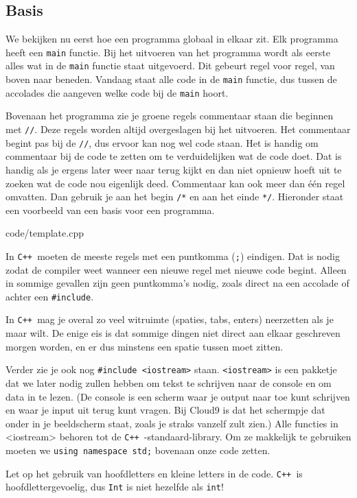 \documentclass[12pt,a4paper]{article}
\newcommand{\code}{}
\newcommand{\icode}{\lstinline}
\newcommand{\mono}{\texttt}
\newcommand{\cpp}{\mono{C++ }}
\begin{document}
\subsection{Basis}
We bekijken nu eerst hoe een programma globaal in elkaar zit.  Elk programma heeft een \icode{main} functie. Bij het uitvoeren van het programma wordt als eerste alles wat in de \icode{main} functie staat uitgevoerd. Dit gebeurt regel voor regel, van boven naar beneden. Vandaag staat alle code in de \icode{main} functie, dus tussen de accolades die aangeven welke code bij de \icode{main} hoort.

Bovenaan het programma zie je groene regels commentaar staan die beginnen met \icode{//}. Deze regels worden altijd overgeslagen bij het uitvoeren. Het commentaar begint pas bij de \icode{//}, dus ervoor kan nog wel code staan. Het is handig om commentaar bij de code te zetten om te verduidelijken wat de code doet. Dat is handig als je ergens later weer naar terug kijkt en dan niet opnieuw hoeft uit te zoeken wat de code nou eigenlijk deed. Commentaar kan ook meer dan \'e\'en regel omvatten. Dan gebruik je aan het begin \icode{/*} en aan het einde \icode{*/}. Hieronder staat een voorbeeld van een basis voor een programma. 

\code{code/template.cpp}

In \cpp moeten de meeste regels met een puntkomma (\icode{;}) eindigen. Dat is nodig zodat de compiler weet wanneer een nieuwe regel met nieuwe code begint. Alleen in sommige gevallen zijn geen puntkomma's nodig, zoals direct na een accolade of achter een \icode{#include}.

In \cpp  mag je overal zo veel witruimte (spaties, tabs, enters) neerzetten als je maar wilt. De enige eis is dat sommige dingen niet direct aan elkaar geschreven morgen worden, en er dus minstens een spatie tussen moet zitten.

Verder zie je ook nog \icode{#include <iostream>} staan. \icode{<iostream>} is een pakketje dat we later nodig zullen hebben om tekst te schrijven naar de console en om data in te lezen.
(De console is een scherm waar je output naar toe kunt schrijven en waar je input uit terug kunt vragen. Bij Cloud9 is dat het schermpje dat onder in je beeldscherm staat, zoals je straks vanzelf zult zien.)
Alle functies in <iostream> behoren tot de \cpp-standaard-library. Om ze makkelijk te gebruiken moeten we \icode{using namespace std;} bovenaan onze code zetten.

Let op het gebruik van hoofdletters en kleine letters in de code. \cpp is hoofdlettergevoelig, dus \icode{Int} is niet hezelfde als \icode{int}!
\end{document}
